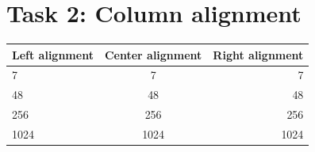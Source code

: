 \documentclass{article}
\begin{document}
\section*{Task 2: Column alignment}

\begin{tabular}{|l|c|r|}
\hline
Left alignment & Center alignment & Right alignment \\
\hline
7 & 7 & 7 \\
48 & 48 & 48 \\
256 & 256 & 256 \\
1024 & 1024 & 1024 \\
\hline
\end{tabular}
\end{document}
